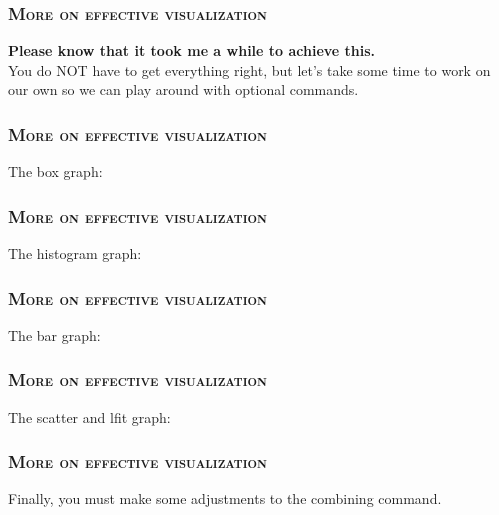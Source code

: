 \documentclass[10pt]{beamer}
\begin{document}
	\begin{frame}
	\frametitle{\textsc{More on effective visualization}}
		\textbf{Please know that it took me a while to achieve this.} \\
		\vspace{1mm}
		You do NOT have to get everything right, but let's take some time to work 
		on our own so we can play around with optional commands. 
	\end{frame}	

	\begin{frame}
	\frametitle{\textsc{More on effective visualization}}
	The box graph:
\begin{stlog}\end{stlog}
	\end{frame}	

	\begin{frame}
	\frametitle{\textsc{More on effective visualization}}
	The histogram graph:
\begin{stlog}\end{stlog}
	\end{frame}	

	\begin{frame}
	\frametitle{\textsc{More on effective visualization}}
	The bar graph:
\begin{stlog}\end{stlog}
	\end{frame}	

	\begin{frame}
	\frametitle{\textsc{More on effective visualization}}
	The scatter and lfit graph:
\begin{stlog}\end{stlog}
	\end{frame}	

	\begin{frame}
	\frametitle{\textsc{More on effective visualization}}
	Finally, you must make some adjustments to the combining command.
\begin{stlog}\end{stlog}
	\end{frame}	
	
\end{document}
